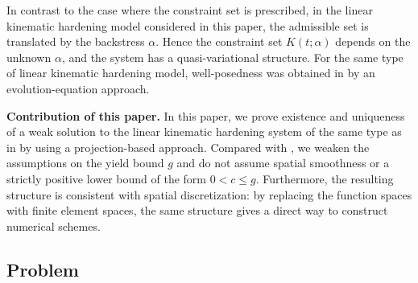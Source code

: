 \documentclass[11pt, a4paper]{article}
\begin{document}
In contrast to the case where the constraint set is prescribed, in the linear kinematic hardening model considered in this paper, the admissible set is translated by the backstress $\alpha$. Hence the constraint set $K(t;\alpha)$ depends on the unknown $\alpha$, and the system has a quasi-variational structure. 
For the same type of linear kinematic hardening model, well-posedness was obtained in \cite{AFK26} by an evolution-equation approach.

\medskip
\noindent\textbf{Contribution of this paper.}
In this paper, we prove existence and uniqueness of a weak solution to the linear kinematic hardening system of the same type as in \cite{AFK26} by using a projection-based approach.
Compared with \cite{AFK26}, we weaken the assumptions on the yield bound $g$ and do not assume spatial smoothness or a strictly positive lower bound of the form $0<c\le g$.
Furthermore, the resulting structure is consistent with spatial discretization: by replacing the function spaces with finite element spaces, the same structure gives a direct way to construct numerical schemes.

\subsection{Problem}
\end{document}
